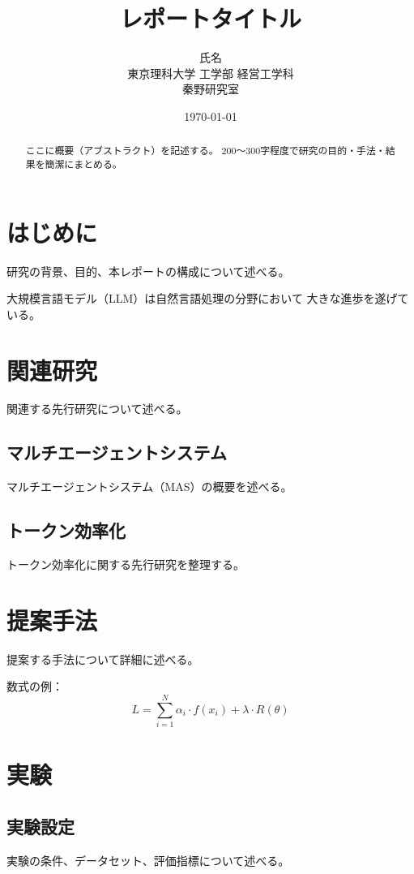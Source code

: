 \documentclass[a4paper,11pt]{jsarticle}
\title{レポートタイトル}
\author{氏名 \\ 東京理科大学 工学部 経営工学科 \\ 秦野研究室}
\date{\today}
\begin{document}
\maketitle

\begin{abstract}
ここに概要（アブストラクト）を記述する。
200〜300字程度で研究の目的・手法・結果を簡潔にまとめる。
\end{abstract}

\section{はじめに}
研究の背景、目的、本レポートの構成について述べる。

大規模言語モデル（LLM）は自然言語処理の分野において
大きな進歩を遂げている\cite{sample2024}。

\section{関連研究}
関連する先行研究について述べる。

\subsection{マルチエージェントシステム}
マルチエージェントシステム（MAS）の概要を述べる。

\subsection{トークン効率化}
トークン効率化に関する先行研究を整理する。

\section{提案手法}
提案する手法について詳細に述べる。

数式の例：
\begin{equation}
  L = \sum_{i=1}^{N} \alpha_i \cdot f(x_i) + \lambda \cdot R(\theta)
\end{equation}

\section{実験}

\subsection{実験設定}
実験の条件、データセット、評価指標について述べる。
\end{document}
